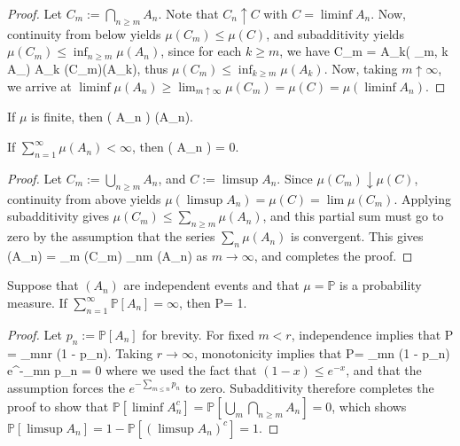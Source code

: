 \begin{proof}
	Let $C_m := \bigcap_{n\geq m} A_n$. Note that $C_n\uparrow C$ with $C = \liminf A_n$. Now, continuity from below yields $\mu(C_m)\leq \mu(C)$, and subadditivity yields $\mu(C_m)\leq \inf_{n\geq m} \mu(A_n)$, since for each $k\geq m$, we have
	\eq
		C_m = A_k\cap \left( \bigcap_{\ell\geq m, \ell\neq k} A_\ell \right) \subseteq A_k \implies \mu(C_m)\leq \mu(A_k),
	\qe
	thus $\mu(C_m)\leq \inf_{k\geq m} \mu(A_k)$. Now, taking $m\uparrow\infty$, we arrive at $\liminf \mu(A_n) \geq \lim_{m\uparrow\infty}\mu(C_m) = \mu(C) = \mu(\liminf A_n)$. 
\end{proof}

\begin{lemma}
	If $\mu$ is finite, then
	\eq
		\mu\big( \limsup A_n \big) \geq \limsup \mu(A_n).
	\qe
\end{lemma}

\begin{lemma}
	If $\sum_{n = 1}^\infty \mu(A_n) < \infty$, then
	\eq
		\mu\left( \limsup A_n \right) = 0.
	\qe
\end{lemma}

\begin{proof}
	Let $C_m := \bigcup_{n\geq m} A_n$, and $C := \limsup A_n$. Since $\mu(C_m)\downarrow\mu(C)$, continuity from above yields $\mu(\limsup A_n) = \mu(C) = \lim\mu(C_m)$. Applying subadditivity gives $\mu(C_m)\leq \sum_{n\geq m} \mu(A_n)$, and this partial sum must go to zero by the assumption that the series $\sum_n \mu(A_n)$ is convergent. This gives
	\eq
		\mu(\limsup A_n) = \lim_m \mu(C_m) \leq \sum_{n\geq m} \mu(A_n) 
	\qe
	as $m\rightarrow\infty$, and completes the proof. 
\end{proof}

\begin{lemma}
	Suppose that $(A_n)$ are independent events and that $\mu = \mathbb P$ is a probability measure. If $\sum_{n = 1}^\infty \mathbb P[A_n] = \infty$, then
	\eq
		\mathbb P = 1.
	\qe
\end{lemma}

\begin{proof}
	Let $p_n := \mathbb P[A_n]$ for brevity. For fixed $m < r$, independence implies that
	\eq
		\mathbb P  = \prod_{m\leq n\leq r} (1 - p_n).
	\qe
	Taking $r\rightarrow\infty$, monotonicity implies that
	\eq
		\mathbb P = \prod_{m\leq n} (1 - p_n) \leq e^{-\sum_{m\leq n} p_n } = 0
	\qe
	where we used the fact that $(1 - x)\leq e^{-x}$, and that the assumption forces the $e^{-\sum_{m\leq n} p_n}$ to zero. Subadditivity therefore completes the proof to show that $\mathbb P[\liminf A_n^c] = \mathbb P[\bigcup_m \bigcap_{n\geq m} A_n] = 0$, which shows $\mathbb P[\limsup A_n] = 1 - \mathbb P[(\limsup A_n)^c] = 1$. 
\end{proof}

